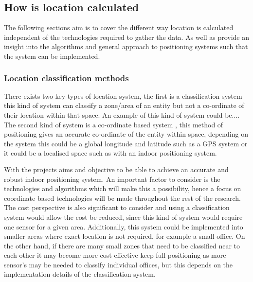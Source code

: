 \subsection{How is location calculated}
The following sections aim is to cover the different way location is calculated independent of the technologies required to gather the data. As well as provide an insight into the algorithms and general approach to positioning systems such that the system can be implemented. 

\subsubsection{Location classification methods}
There exists two key types of location system, the first is a classification system \citetemp this kind of system can classify a zone/area of an entity but not a co-ordinate of their location within that space. An example of this kind of system could be....
The second kind of system is a co-ordinate based system \citetemp, this method of positioning gives an accurate co-ordinate of the entity within space, depending on the system this could be a global longitude and latitude such as a GPS system or it could be a localised space such as with an indoor positioning system.

With the projects aims and objective to be able to achieve an accurate and robust indoor positioning system. An important factor to consider is the technologies and algorithms which will make this a possibility, hence a focus on coordinate based technologies will be made throughout the rest of the research. The cost perspective is also significant to consider and using a classification system would allow the cost be reduced, since this kind of system would require one sensor for a given area. Additionally, this system could be implemented into smaller areas where exact location is not required, for example a small office. On the other hand, if there are many small zones that need to be classified near to each other it may become more cost effective keep full positioning as more sensor's may be needed to classify individual offices, but this depends on the implementation details of the classification system.  

